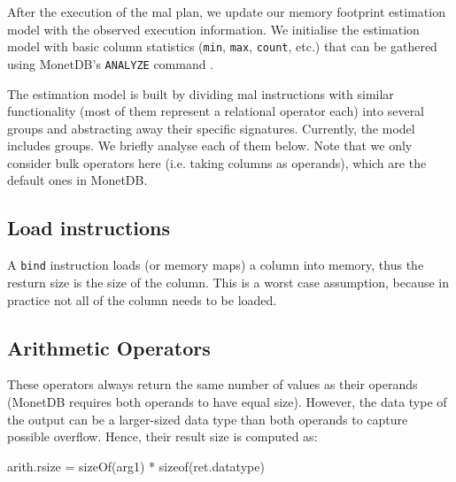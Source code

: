 \documentclass[conference]{IEEEtran}
\def\Skip{\par\medskip\nobreak\noindent}
\begin{document}
After the execution of the {\sc mal} plan, we update our memory footprint estimation model with the observed execution information.
We initialise the estimation model with basic column statistics (\texttt{\small min}, \texttt{\small max}, \texttt{\small count}, etc.) that can be gathered using MonetDB’s \texttt{\small ANALYZE} command .

The estimation model is built by dividing {\sc mal} instructions with similar functionality (most of them represent a relational operator each) into several groups and abstracting away their specific signatures.
Currently, the model includes  groups.
We briefly analyse each of them below.
Note that we only consider bulk operators here (i.e. taking columns as operands), which are the default ones in MonetDB.

\subsection{Load instructions}
A \texttt{\small bind} instruction loads (or memory maps) a column into memory, thus the resturn size is the size of the column.
This is a worst case assumption, because in practice not all of the column needs to be loaded.

\subsection{Arithmetic Operators}
These operators always return the same number of values as their operands (MonetDB requires both operands to have equal size).
However, the data type of the output can be a larger-sized data type than both operands to capture possible overflow.
Hence, their result size is computed as:
\begin{verb}
arith.rsize = sizeOf(arg1) * sizeof(ret.datatype)
\end{verb}
\end{document}
